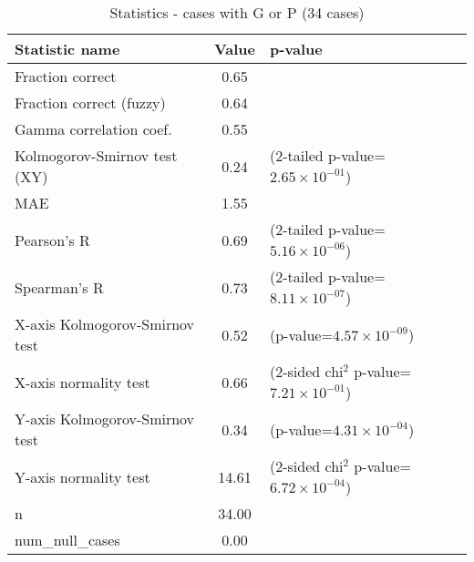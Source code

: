 \documentclass[10pt, letterpaper, oneside, titlepage, landscape]{scrreprt}
\begin{document}
\begin{table}[H]\begin{center}
\begin{tabular}{ l S[table-format=3.2] l}
Statistic name & {Value} & p-value\\
\hline
Fraction correct & 0.65 & \\
Fraction correct (fuzzy) & 0.64 & \\
Gamma correlation coef. & 0.55 & \\
Kolmogorov-Smirnov test (XY) & 0.24 & (2-tailed p-value=$2.65\times10^{-01}$)\\
MAE & 1.55 & \\
Pearson's R & 0.69 & (2-tailed p-value=$5.16\times10^{-06}$)\\
Spearman's R & 0.73 & (2-tailed p-value=$8.11\times10^{-07}$)\\
X-axis Kolmogorov-Smirnov test & 0.52 & (p-value=$4.57\times10^{-09}$)\\
X-axis normality test & 0.66 & (2-sided chi$^{2}$ p-value=$7.21\times10^{-01}$)\\
Y-axis Kolmogorov-Smirnov test & 0.34 & (p-value=$4.31\times10^{-04}$)\\
Y-axis normality test & 14.61 & (2-sided chi$^{2}$ p-value=$6.72\times10^{-04}$)\\
n & 34.00 & \\
num\_null\_cases & 0.00 & \\
\end{tabular}
\caption{Statistics - cases with G or P (34 cases)}
\end{center}\end{table}
\end{document}
